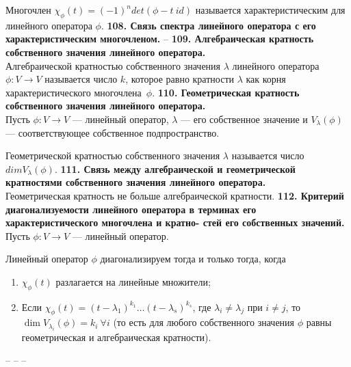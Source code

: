 \documentclass{article}
\begin{document}
Многочлен $\chi_{\phi}(t) = (-1)^ndet(\phi - t ~id)$ называется характеристическим для линейного оператора $\phi$.
\newline
\newline
\textbf{108. Связь спектра линейного оператора с его характеристическим многочленом.}
--
\newline
\newline
\textbf{109. Алгебраическая кратность собственного значения линейного оператора.}\\
Алгебраической кратностью собственного значения $\lambda$ линейного оператора $\phi \colon V \to V$ называется число $k$, которое равно кратности $\lambda$ как корня характеристического многочлена~$\phi$.
\newline
\newline
\textbf{110. Геометрическая кратность собственного значения линейного оператора.}\\
Пусть $\phi\colon V \rightarrow V$ --- линейный оператор, $\lambda$ --- его собственное значение и $V_\lambda(\phi)$ --- соответствующее собственное подпространство.

Геометрической кратностью собственного значения $\lambda$ называется число $dim V_\lambda(\phi)$.
\newline
\newline
\textbf{111. Связь между алгебраической и геометрической кратностями собственного значения линейного оператора.}\\
Геометрическая кратность не больше алгебраической кратности.
\newline
\newline
\textbf{112. Критерий диагонализуемости линейного оператора в терминах его характеристического многочлена и кратно-
стей его собственных значений.}\\
Пусть $\phi\colon V \rightarrow V$ --- линейный оператор.

Линейный оператор $\phi$ диагонализируем тогда и только тогда, когда 
\begin{enumerate}
\item $\chi_\phi(t)$ разлагается на линейные множители;
\item Если $\chi_\phi(t) = (t - \lambda_1)^{k_1}\dots(t - \lambda_s)^{k_s}$, где $\lambda_i \neq \lambda_j$ при $i \neq j$, то $\dim V_{\lambda_i}(\phi) = k_i \ \forall i$ (то есть для любого собственного значения $\phi$ равны геометрическая и алгебраическая кратности).
\end{enumerate}
\textbf{}
--
\newline
\newline
\textbf{}
--
\newline
\newline
\textbf{}
--
\newline
\newline
\end{document}
